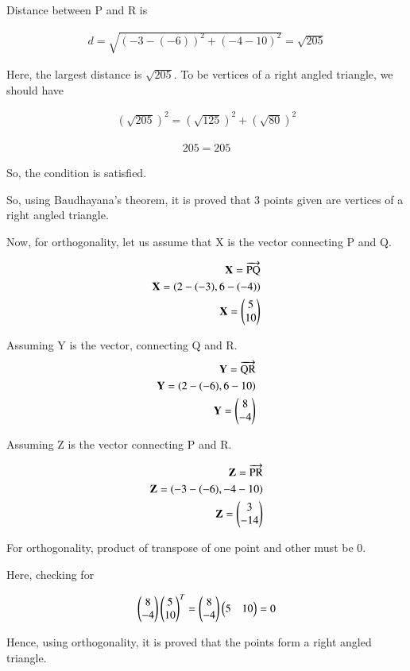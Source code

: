 \documentclass[journal,12pt,twocolumn]{IEEEtran}
\begin{document}
Distance between P and R is 

\begin{align}
d = \sqrt{(-3-(-6))^2+(-4-10)^2}
=\sqrt{205}
\end{align}


Here, the largest distance is $\sqrt{205}$. To be vertices of a right angled triangle, we should have 




\begin{align}
  (\sqrt{205})^2 = (\sqrt{125})^2 + (\sqrt{80})^2
\end{align}


\begin{align}
  205 = 205
\end{align}

So, the condition is satisfied. 

So, using Baudhayana's theorem, it is proved that 3 points given are vertices of a right angled triangle. 

Now, for orthogonality, let us assume that X is the vector connecting P and Q.

\begin{align}
\textbf{X} = \overrightarrow{\text {PQ}}
\\
         \textbf{X}=(2-(-3), 6-(-4))
 \\\textbf{X}= \begin{pmatrix}
5\\
10 
\end{pmatrix}
\end{align}

Assuming Y is the vector, connecting Q and R. 
\begin{align}
\textbf{Y} = \overrightarrow{\text {QR}}
\\
         \textbf{Y}=(2-(-6), 6-10)
 \\\textbf{Y}= \begin{pmatrix}
8\\
-4 
\end{pmatrix}
\end{align}

Assuming Z is the vector connecting P and R. 

\begin{align}
\textbf{Z} = \overrightarrow{\text {PR}}
\\
         \textbf{Z}=(-3-(-6), -4-10)
 \\\textbf{Z}= \begin{pmatrix}
3\\
-14 
\end{pmatrix}
\end{align}

For orthogonality, product of transpose of one point and other must be 0. 

Here, checking for 


\begin{align}
    \begin{pmatrix}
8\\
-4 
\end{pmatrix}\begin{pmatrix} 5\\
10
\end{pmatrix}^T =  \begin{pmatrix}
8\\
-4 
\end{pmatrix} \begin{pmatrix}
5 & 10
\end{pmatrix}=0
\end{align}

Hence, using orthogonality, it is proved that the points form a right angled triangle. 
\end{document}
